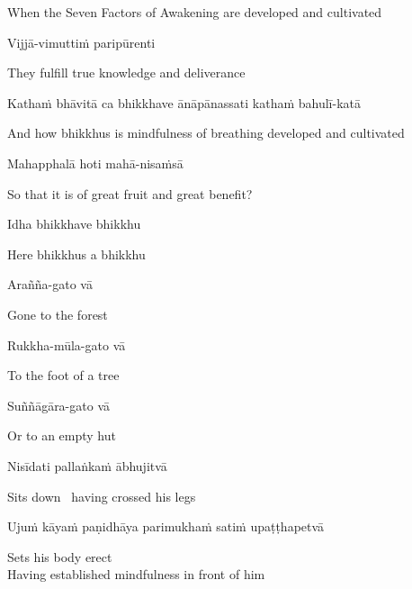 \begin{english}
  When the Seven Factors of Awakening are developed and cultivated
\end{english}

Vijjā-vimuttiṁ paripūrenti

\begin{english}
  They fulfill true knowledge and deliverance
\end{english}

Kathaṁ bhāvitā ca bhikkhave ānāpānassati kathaṁ bahulī-katā

\begin{english-hang}
  And how bhikkhus is mindfulness of breathing developed and cultivated
\end{english-hang}

Mahapphalā hoti mahā-nisaṁsā

\begin{english}
  So that it is of great fruit and great benefit?
\end{english}

Idha bhikkhave bhikkhu

\begin{english}
  Here bhikkhus a bhikkhu
\end{english}

Arañña-gato vā

\begin{english}
  Gone to the forest
\end{english}

Rukkha-mūla-gato vā

\begin{english}
  To the foot of a tree
\end{english}

Suññāgāra-gato vā

\begin{english}
  Or to an empty hut
\end{english}

Nisīdati pallaṅkaṁ ābhujitvā

\begin{english}
  Sits down \breathmark\ having crossed his legs
\end{english}

Ujuṁ kāyaṁ paṇidhāya parimukhaṁ satiṁ upaṭṭhapetvā

\begin{english}
  Sets his body erect\\
  Having established mindfulness in front of him
\end{english}

